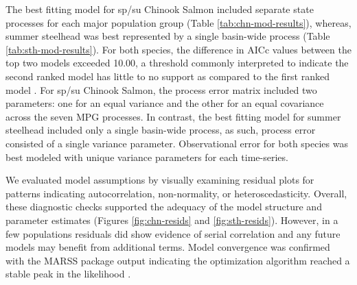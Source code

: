 \documentclass[12pt,a4paper]{article}
\begin{document}
The best fitting model for sp/su Chinook Salmon included separate state processes for each major population group (Table \ref{tab:chn-mod-results}), whereas, summer steelhead was best represented by a single basin-wide process (Table \ref{tab:sth-mod-results}). For both species, the difference in AICc values between the top two models exceeded 10.00, a threshold commonly interpreted to indicate the second ranked model has little to no support as compared to the first ranked model \autocite{burnham_multimodel_2004}. For sp/su Chinook Salmon, the process error matrix included two parameters: one for an equal variance and the other for an equal covariance across the seven MPG processes. In contrast, the best fitting model for summer steelhead included only a single basin-wide process, as such, process error consisted of a single variance parameter. Observational error for both species was best modeled with unique variance parameters for each time-series.

We evaluated model assumptions by visually examining residual plots for patterns indicating autocorrelation, non-normality, or heteroscedasticity. Overall, these diagnostic checks supported the adequacy of the model structure and parameter estimates (Figures \ref{fig:chn-resids} and \ref{fig:sth-resids}). However, in a few populations residuals did show evidence of serial correlation and any future models may benefit from additional terms. Model convergence was confirmed with the MARSS package output indicating the optimization algorithm reached a stable peak in the likelihood \autocite{holmes_2021}.
\end{document}
